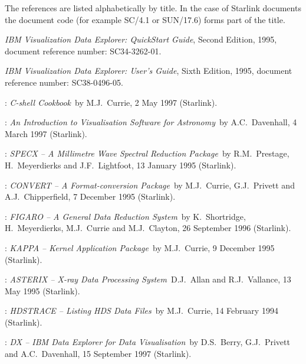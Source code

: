 \documentclass[twoside,11pt]{starlink}
\begin{document}
\begin{thebibliography}{99}

  \item[~] The references are listed alphabetically by title.  In the
   case of Starlink documents the document code (for example SC/4.1
   or SUN/17.6) forms part of the title.

   \textit{IBM Visualization Data Explorer: QuickStart
   Guide}, Second Edition, 1995, document reference number:
   SC34-3262-01.

   \textit{IBM Visualization Data Explorer: User's Guide},
   Sixth Edition, 1995, document reference number: SC38-0496-05.

   :
   \textit{C-shell Cookbook}\, by M.J.~Currie, 2 May 1997 (Starlink).

   :
   \textit{An Introduction to Visualisation Software for Astronomy}\,
   by A.C.~Davenhall, 4 March 1997 (Starlink).

   :
   \textit{SPECX -- A Millimetre Wave Spectral Reduction Package}\, by
   R.M.~Prestage, H.~Meyerdierks and    J.F.~Lightfoot, 13 January 1995
   (Starlink).

   :
   \textit{CONVERT -- A Format-conversion Package}\, by M.J.~Currie,
   G.J.~Privett and A.J.~Chipperfield, 7 December 1995 (Starlink).

   :
   \textit{FIGARO -- A General Data Reduction System}\, by K.~Shortridge,
   H.~Meyerdierks, M.J.~Currie and M.J.~Clayton, 26 September 1996
   (Starlink).

   :
   \textit{KAPPA -- Kernel Application Package}\, by M.J.~Currie,
   9 December 1995 (Starlink).

   :
   \textit{ASTERIX -- X-ray Data Processing System}\,
   D.J.~Allan and R.J.~Vallance, 13 May 1995 (Starlink).

   :
   \textit{HDSTRACE -- Listing HDS Data Files}\, by M.J.~Currie,
   14 February 1994 (Starlink).

   :
   \textit{DX -- IBM Data Explorer for Data Visualisation}\, by D.S.~Berry,
   G.J.~Privett and A.C.~Davenhall, 15 September 1997 (Starlink).

\end{thebibliography}


\typeout{  }
\typeout{*****************************************************}
\typeout{  }
\typeout{  }
\typeout{*****************************************************}
\typeout{  }
\end{document}
